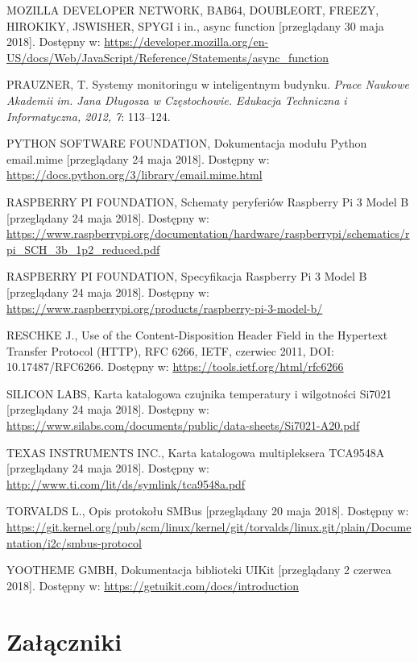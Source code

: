 \documentclass[a4paper,11pt,twoside]{article}
\begin{document}
\begin{thebibliography}{9}
\uppercase{Mozilla Developer Network, Bab64, doubleOrt, freezy, hirokiky, jswisher, spygi} i in., async function [przeglądany 30 maja 2018].
Dostępny w: \url{https://developer.mozilla.org/en-US/docs/Web/JavaScript/Reference/Statements/async_function}

PRAUZNER, T. Systemy monitoringu w inteligentnym budynku. \textit{Prace Naukowe Akademii im. Jana Długosza w Częstochowie. Edukacja Techniczna i Informatyczna, 2012, 7}: 113--124.

\uppercase{Python Software Foundation}, Dokumentacja modułu Python email.mime [przeglądany 24 maja 2018].
Dostępny w: \url{https://docs.python.org/3/library/email.mime.html}

\uppercase{Raspberry Pi Foundation}, Schematy peryferiów Raspberry Pi 3 Model B [przeglądany 24 maja 2018].
Dostępny w: \url{https://www.raspberrypi.org/documentation/hardware/raspberrypi/schematics/rpi_SCH_3b_1p2_reduced.pdf}

\uppercase{Raspberry Pi Foundation}, Specyfikacja Raspberry Pi 3 Model B [przeglądany 24 maja 2018].
Dostępny w: \url{https://www.raspberrypi.org/products/raspberry-pi-3-model-b/}

\uppercase{Reschke J.}, Use of the Content-Disposition Header Field in the Hypertext Transfer Protocol (HTTP), RFC 6266, IETF, czerwiec 2011, DOI: 10.17487/RFC6266.
Dostępny w: \url{https://tools.ietf.org/html/rfc6266}

\uppercase{Silicon Labs}, Karta katalogowa czujnika temperatury i wilgotności Si7021 [przeglądany 24 maja 2018].
Dostępny w: \url{https://www.silabs.com/documents/public/data-sheets/Si7021-A20.pdf}

\uppercase{Texas Instruments Inc.}, Karta katalogowa multipleksera TCA9548A [przeglądany 24 maja 2018].
Dostępny w: \url{http://www.ti.com/lit/ds/symlink/tca9548a.pdf}

\uppercase{Torvalds L.}, Opis protokołu SMBus [przeglądany 20 maja 2018].
Dostępny w: \url{https://git.kernel.org/pub/scm/linux/kernel/git/torvalds/linux.git/plain/Documentation/i2c/smbus-protocol}

\uppercase{YOOTheme GmbH}, Dokumentacja biblioteki UIKit [przeglądany 2 czerwca 2018].
Dostępny w: \url{https://getuikit.com/docs/introduction}

\end{thebibliography}

\newpage
\section{Załączniki}
\end{document}
